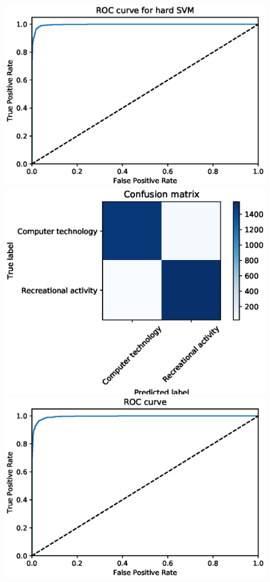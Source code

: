 \documentclass[letterpaper]{article}
\begin{document}
\begin{figure}[!htb]
\centering
\begin{minipage}{0.5\textwidth}
\includegraphics[width=1.0\textwidth]{roc-lsi-hard-svm}
\end{minipage}%
\begin{minipage}{0.5\textwidth}
\includegraphics[width=1.0\textwidth]{conf-mat-lsi-hard-svm}
\end{minipage}
\begin{minipage}{0.5\textwidth}
\includegraphics[width=1.0\textwidth]{roc-nmf-hard-svm}

\end{minipage}
\end{figure}
\end{document}
